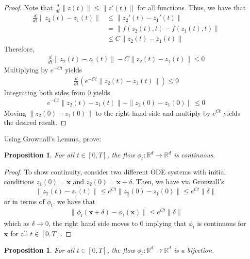 \documentclass[12pt,letterpaper, onecolumn]{exam}
\newtheorem{proposition}[theorem]{Proposition}
\theoremstyle{definition}
\begin{document}
\begin{proof}
    Note that $\frac{d}{dt}\|z(t)\| \leq \|z'(t)\|$ for all functions. Thus, we have that 
    \begin{align}
        \frac{d}{dt}\|z_2(t) - z_1(t)\| &\leq \|z_2'(t) - z_1'(t)\| \nonumber  \\ 
        &= \|f(z_2(t), t) - f(z_1(t), t)\| \nonumber \\ 
        &\leq C\|z_2(t) -z_1(t)\|  
    \end{align}
    Therefore, 
    \begin{align}
        \frac{d}{dt}\|z_2(t) - z_1(t)\| - C\|z_2(t) - z_1(t)\| \leq 0 
    \end{align}
    Multiplying by $e^{-Ct}$ yields
    \begin{align}
        \frac{d}{dt}(e^{-Ct} \|z_2(t) - z_1(t)\|) \leq 0
    \end{align}
    Integrating both sides from $0$ yields
    \begin{align}
        e^{-Ct} \|z_2(t) - z_1(t)\| - \|z_2(0) - z_1(0)\| \leq 0 
    \end{align}
    Moving $\|z_2(0) - z_1(0)\|$ to the right hand side and multiply by $e^{Ct}$ yields the desired result. 
\end{proof}
\color{black}

\noindent 
Using Grownall's Lemma, prove:
\begin{proposition}
    For all $t \in [0, T]$, the flow $\phi_t:\mathbb{R}^d \to \mathbb{R}^d$ is continuous. 
\end{proposition}

\begin{proof}
    To show continuity, consider two different ODE systems with initial conditions $z_1(0) = \bm{x}$ and $z_2(0) = \bm{x}+\delta $. Then, we have via Gronwall's
    \begin{align}
        \|z_2(t) - z_1(t)\| \leq e^{Ct} \|z_2(0) - z_1(0)\| \leq e^{Ct}\|\delta\|
    \end{align}
    or in terms of $\phi_t$, we have that 
    \begin{align}
        \|\phi_t(\bm{x}+\delta) - \phi_t(\bm{x})\| \leq e^{Ct}\|\delta\| 
    \end{align}
    which as $\delta \to 0$, the right hand side moves to $0$ implying that $\phi_t$ is continuous for $\bm{x}$ for all $t \in [0, T]$. 
\end{proof}
\color{black}
\begin{proposition}
    For all $t \in [0, T]$, the flow $\phi_t:\mathbb{R}^d \to \mathbb{R}^d$ is a bijection. 
\end{proposition}
\end{document}
